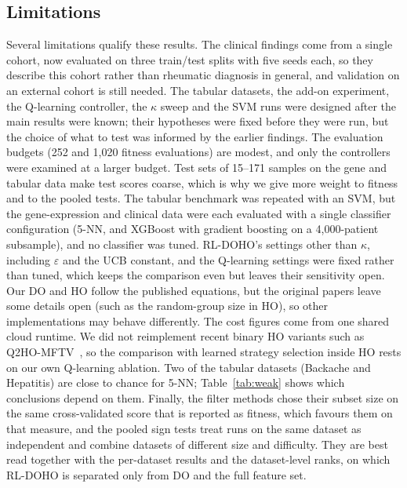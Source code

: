 \documentclass[journal]{IEEEtran}
\begin{document}
\subsection{Limitations}
Several limitations qualify these results. The clinical findings come from a single cohort, now evaluated on three train/test splits with five seeds each, so they describe this cohort rather than rheumatic diagnosis in general, and validation on an external cohort is still needed. The tabular datasets, the add-on experiment, the Q-learning controller, the $\kappa$ sweep and the SVM runs were designed after the main results were known; their hypotheses were fixed before they were run, but the choice of what to test was informed by the earlier findings. The evaluation budgets (252 and 1,020 fitness evaluations) are modest, and only the controllers were examined at a larger budget. Test sets of 15--171 samples on the gene and tabular data make test scores coarse, which is why we give more weight to fitness and to the pooled tests. The tabular benchmark was repeated with an SVM, but the gene-expression and clinical data were each evaluated with a single classifier configuration (5-NN, and XGBoost with gradient boosting on a 4,000-patient subsample), and no classifier was tuned. RL-DOHO's settings other than $\kappa$, including $\varepsilon$ and the UCB constant, and the Q-learning settings were fixed rather than tuned, which keeps the comparison even but leaves their sensitivity open. Our DO and HO follow the published equations, but the original papers leave some details open (such as the random-group size in HO), so other implementations may behave differently. The cost figures come from one shared cloud runtime. We did not reimplement recent binary HO variants such as Q2HO-MFTV~\cite{hashjin2025q2ho}, so the comparison with learned strategy selection inside HO rests on our own Q-learning ablation. Two of the tabular datasets (Backache and Hepatitis) are close to chance for 5-NN; Table~\ref{tab:weak} shows which conclusions depend on them. Finally, the filter methods chose their subset size on the same cross-validated score that is reported as fitness, which favours them on that measure, and the pooled sign tests treat runs on the same dataset as independent and combine datasets of different size and difficulty. They are best read together with the per-dataset results and the dataset-level ranks, on which RL-DOHO is separated only from DO and the full feature set.

\end{document}
